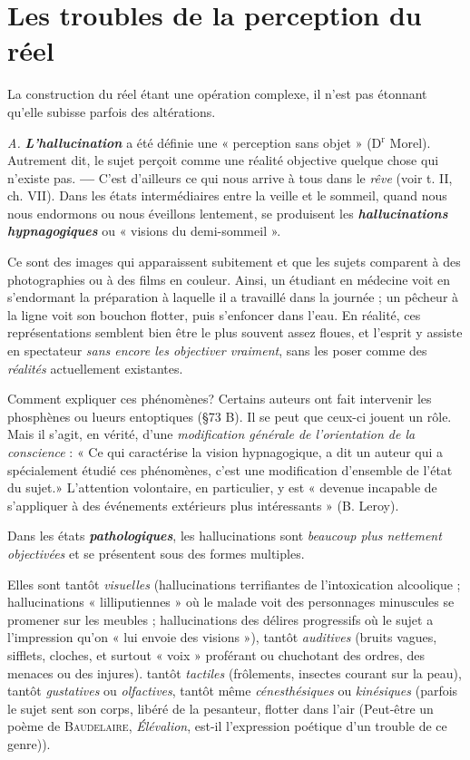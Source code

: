 \section{Les troubles de la perception du réel}%
La construction du réel étant une opération complexe, il n’est pas étonnant
qu’elle subisse parfois des altérations.

{\it A.} \textbf{\textit {L'hallucination}} a été définie une « perception sans objet »
(D$^\text{r}$ Morel). Autrement dit, le sujet perçoit comme une réalité objective
quelque chose qui n’existe pas. {\bf —} C’est d’ailleurs ce qui nous
arrive à tous dans le {\it rêve} (voir t. II, ch. VII). Dans les états intermédiaires
entre la veille et le sommeil, quand nous nous endormons ou
nous éveillons lentement, se produisent les \textbf{\textit {hallucinations hypnagogiques}}
ou « visions du demi-sommeil ».

Ce sont des images qui apparaissent subitement et que les sujets comparent
à des photographies ou à des films en couleur. Ainsi, un étudiant en
médecine voit en s’endormant la préparation à laquelle il a travaillé dans la
journée ; un pêcheur à la ligne voit son bouchon flotter, puis s’enfoncer
dans l’eau. En réalité, ces représentations semblent bien être le plus souvent
assez floues, et l'esprit y assiste en spectateur {\it sans encore les objectiver
vraiment}, sans les poser comme des {\it réalités} actuellement existantes.

Comment expliquer ces phénomènes? Certains auteurs ont fait
intervenir les phosphènes ou lueurs entoptiques (\S 73 B). Il se peut
que ceux-ci jouent un rôle. Mais il s’agit, en vérité, d’une {\it modification
générale de l'orientation de la conscience} : « Ce qui caractérise la vision
hypnagogique, a dit un auteur qui a spécialement étudié ces phénomènes,
c’est une modification d’ensemble de l’état du sujet.» L’attention
volontaire, en particulier, y est « devenue incapable de s’appliquer
à des événements extérieurs plus intéressants » (B. Leroy).

Dans les états \textbf{\textit {pathologiques}}, les hallucinations sont {\it beaucoup
plus nettement objectivées} et se présentent sous des formes multiples.

Elles sont tantôt {\it visuelles} (hallucinations terrifiantes de l’intoxication
alcoolique ; hallucinations « lilliputiennes » où le malade voit des personnages
minuscules se promener sur les meubles ; hallucinations des délires
progressifs où le sujet a l'impression qu’on « lui envoie des visions »), tantôt {\it
auditives} (bruits vagues, sifflets, cloches, et surtout « voix » proférant ou
chuchotant des ordres, des menaces ou des injures). tantôt {\it tactiles} (frôlements,
insectes courant sur la peau), tantôt {\it gustatives} ou {\it olfactives}, tantôt
même {\it cénesthésiques} ou {\it kinésiques} (parfois le sujet sent son corps, libéré
de la pesanteur, flotter dans l’air
{\scriptsize (Peut-être un poème de \textsc{Baudelaire}, {\it Élévalion}, est-il l'expression poétique d’un
trouble de ce genre)}).

